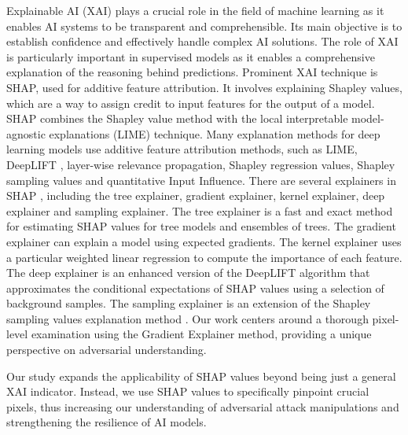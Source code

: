 \documentclass[10pt, conference, a4paper, final]{IEEEtran}
\begin{document}
Explainable AI (XAI) plays a crucial role in the field of machine learning as it enables AI systems to be transparent and comprehensible. Its main objective is to establish confidence and effectively handle complex AI solutions. The role of XAI is particularly important in supervised models as it enables a comprehensive explanation of the reasoning behind predictions. Prominent XAI technique is SHAP, used for additive feature attribution. It involves explaining Shapley values, which are a way to assign credit to input features for the output of a model. SHAP combines the Shapley value method with the local interpretable model-agnostic explanations (LIME) \cite {Ribeiro} technique. Many explanation methods for deep learning models use additive feature attribution methods, such as LIME, DeepLIFT \cite {Shrikumar}, layer-wise relevance propagation, Shapley regression values, Shapley sampling values and quantitative Input Influence. There are several explainers in SHAP \cite {LundbergandS}, including the tree explainer, gradient explainer, kernel explainer, deep explainer and sampling explainer. The tree explainer is a fast and exact method for estimating SHAP values for tree models and ensembles of trees. The gradient explainer can explain a model using expected gradients. The kernel explainer uses a particular weighted linear regression to compute the importance of each feature. The deep explainer is an enhanced version of the DeepLIFT algorithm that approximates the conditional expectations of SHAP values using a selection of background samples. The sampling explainer is an extension of the Shapley sampling values explanation method \cite{ZhangK}. Our work centers around a thorough pixel-level examination using the Gradient Explainer method, providing a unique perspective on adversarial understanding.




Our study expands the applicability of SHAP values beyond being just a general XAI indicator. Instead, we use SHAP values to specifically pinpoint crucial pixels, thus increasing our understanding of adversarial attack manipulations and strengthening the resilience of AI models.
\end{document}
